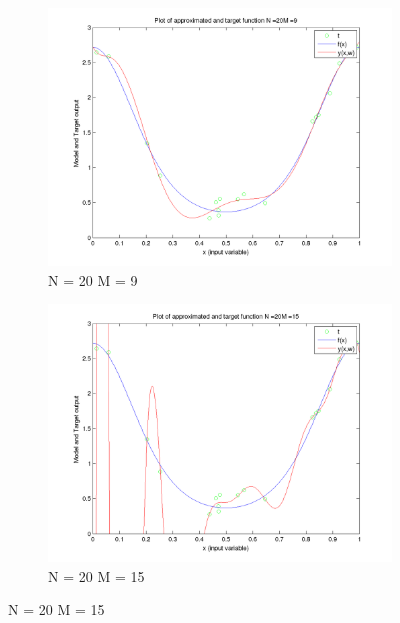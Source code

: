 \documentclass{article}
\begin{document}
\begin{figure}[H]
\begin{subfigure}{.5\textwidth}
\centering
\includegraphics[width=\linewidth]{VaryingM_N20M9}
\caption{N = 20 M = 9}
\end{subfigure}
\begin{subfigure}{.5\textwidth}
\includegraphics[width=\linewidth]{VaryingM_N20M15}
\caption{N = 20 M = 15}
\end{subfigure}



\end{figure}
\end{document}
